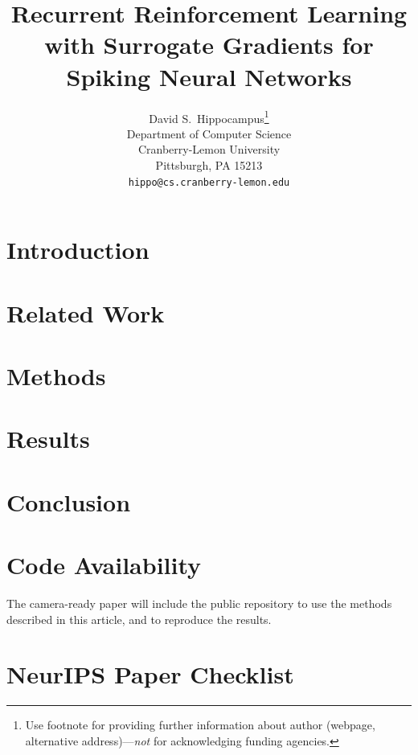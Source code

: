 \documentclass{article}
\title{Recurrent Reinforcement Learning with Surrogate Gradients for Spiking Neural Networks}
\author{%
  David S.~Hippocampus\thanks{Use footnote for providing further information
    about author (webpage, alternative address)---\emph{not} for acknowledging
    funding agencies.} \\
  Department of Computer Science\\
  Cranberry-Lemon University\\
  Pittsburgh, PA 15213 \\
  \texttt{hippo@cs.cranberry-lemon.edu} \\
}
\begin{document}
\maketitle


\begin{abstract}

\end{abstract}

\section{Introduction}


\section{Related Work}


\section{Methods}


\section{Results}


\section{Conclusion}

\section{Code Availability}
The camera-ready paper will include the public repository to use the methods described in this article, and to reproduce the results.
 



\section*{NeurIPS Paper Checklist}

\end{document}

